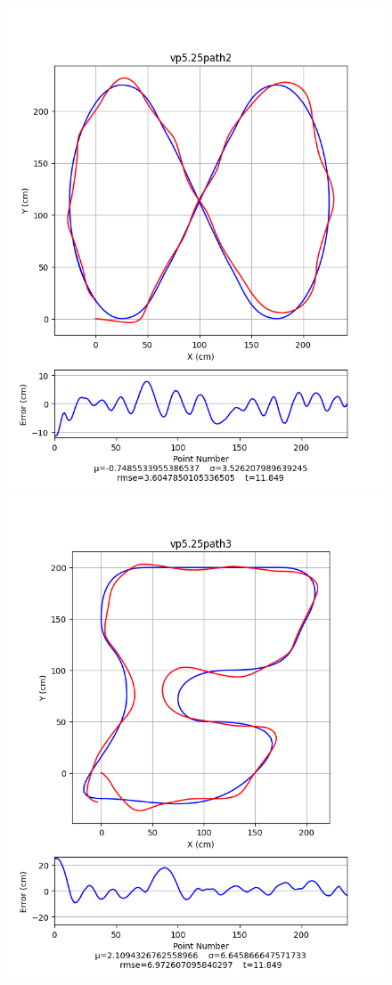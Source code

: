 \documentclass[12pt]{article}
\begin{document}
\begin{flushleft}
\begin{figure}[H]
\includegraphics[width=\linewidth]{images/pathData/vppath2}
\endminipage\\
\includegraphics[width=\linewidth]{images/pathData/vppath3}

\end{figure}
\end{flushleft}
\end{document}
